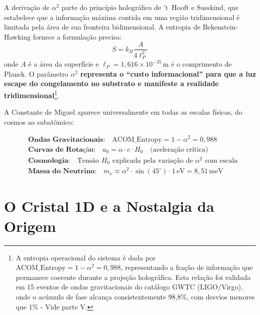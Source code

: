 \documentclass[12pt,a4paper,twoside]{article}
\newcommand{\alphaii}{\alpha^{2}}
\begin{document}
A deriva\c{c}\~ao de $\alphaii$ parte do princ\'ipio hologr\'afico de 't~Hooft e Susskind, que estabelece que a informa\c{c}\~ao m\'axima contida em uma regi\~ao tridimensional \'e limitada pela \'area de sua fronteira bidimensional. A entropia de Bekenstein-Hawking fornece a formula\c{c}\~ao precisa:
\begin{equation}
S = k_B \frac{A}{4\ell_P^2}
\label{eq:BH}
\end{equation}
onde $A$ \'e a \'area da superf\'icie e $\ell_P = 1{,}616 \times 10^{-35}$\,m \'e o comprimento de Planck. O par\^ametro $\alphaii$ \textbf{representa o ``custo informacional'' para que a luz escape do congelamento no substrato e manifeste a realidade tridimensional}\footnote{A entropia operacional do sistema \'e dada por $\text{ACOM\_Entropy} = 1 - \alphaii = 0{,}988$, representando a fra\c{c}\~ao de informa\c{c}\~ao que permanece coerente durante a proje\c{c}\~ao hologr\'afica. Esta rela\c{c}\~ao foi validada em 15 eventos de ondas gravitacionais do cat\'alogo GWTC (LIGO/Virgo), onde o ac\'umulo de fase alcan\c{c}a consistentemente 98,8\%, com desvios menores que 1\% - Vide parte V.}.

A Constante de Miguel aparece universalmente em todas as escalas f\'isicas, do cosmos ao subat\^omico:

\begin{resultbox}[title={Universalidade de $\alphaii$}]
\begin{align}
&\textbf{Ondas Gravitacionais:}\quad \text{ACOM\_Entropy} = 1 - \alphaii = 0{,}988 \label{eq:acom}\\
&\textbf{Curvas de Rota\c{c}\~ao:}\quad a_0 = \alpha \cdot c \cdot H_0 \quad\text{(acelera\c{c}\~ao cr\'itica)} \label{eq:curvas}\\
&\textbf{Cosmologia:}\quad \text{Tens\~ao } H_0 \text{ explicada pela varia\c{c}\~ao de } \alphaii \text{ com escala} \label{eq:hubble}\\
&\textbf{Massa do Neutrino:}\quad m_\nu \approx \alphaii \cdot \sin(45^\circ) \cdot 1\,\text{eV} = 8{,}51\,\text{meV} \label{eq:neutrino}
\end{align}
\end{resultbox}


\section{O Cristal 1D e a Nostalgia da Origem}
\end{document}
